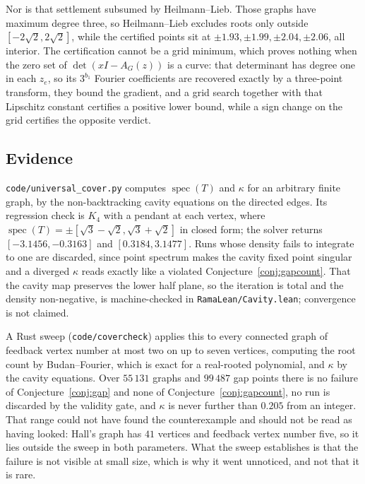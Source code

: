\documentclass[11pt]{article}
\theoremstyle{remark}
\begin{document}
Nor is that settlement subsumed by Heilmann--Lieb. Those graphs have maximum degree three, so
Heilmann--Lieb excludes roots only outside $[-2\sqrt2,2\sqrt2]$, while the certified points
sit at $\pm1.93,\pm1.99,\pm2.04,\pm2.06$, all interior. The certification cannot be a grid
minimum, which proves nothing when the zero set of $\det(xI-A_G(z))$ is a curve: that
determinant has degree one in each $z_e$, so its $3^{b_1}$ Fourier coefficients are recovered
exactly by a three-point transform, they bound the gradient, and a grid search together with
that Lipschitz constant certifies a positive lower bound, while a sign change on the grid
certifies the opposite verdict.

\subsection{Evidence}

\texttt{code/universal\_cover.py} computes $\operatorname{spec}(T)$ and $\kappa$ for an
arbitrary finite graph, by the non-backtracking cavity equations on the directed edges. Its
regression check is $K_4$ with a pendant at each vertex, where
$\operatorname{spec}(T)=\pm[\sqrt3-\sqrt2,\sqrt3+\sqrt2]$ in closed form; the solver returns
$[-3.1456,-0.3163]$ and $[0.3184,3.1477]$. Runs whose density fails to integrate to one are
discarded, since point spectrum makes the cavity fixed point singular and a diverged
$\kappa$ reads exactly like a violated Conjecture~\ref{conj:gapcount}. That the cavity map
preserves the lower half plane, so the iteration is total and the density non-negative, is
machine-checked in \texttt{RamaLean/Cavity.lean}; convergence is not claimed.

A Rust sweep (\texttt{code/covercheck}) applies this to every connected graph of feedback
vertex number at most two on up to seven vertices, computing the root count by
Budan--Fourier, which is exact for a real-rooted polynomial, and $\kappa$ by the cavity
equations. Over $55\,131$ graphs and $99\,487$ gap points there is no failure of
Conjecture~\ref{conj:gap} and none of Conjecture~\ref{conj:gapcount}, no run is discarded by
the validity gate, and $\kappa$ is never further than $0.205$ from an integer.
That range could not have found the counterexample and should not be read as having looked:
Hall's graph has $41$ vertices and feedback vertex number five, so it lies outside the sweep in
both parameters. What the sweep establishes is that the failure is not visible at small size,
which is why it went unnoticed, and not that it is rare.
\end{document}
